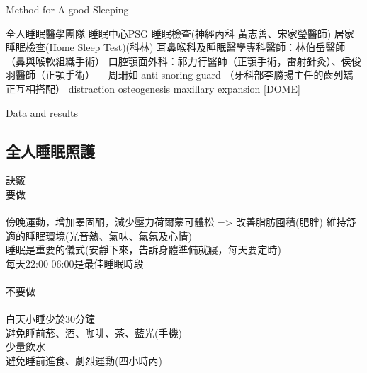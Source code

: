 \documentclass[aspectratio=169]{beamer}
\begin{document}
\begin{frame}{Method for A good Sleeping}
\begin{block}{全人睡眠醫學團隊}
睡眠中心PSG 睡眠檢查(神經內科 黃志善、宋家瑩醫師)
居家睡眠檢查(Home Sleep Test)(科林)
耳鼻喉科及睡眠醫學專科醫師：林伯岳醫師（鼻與喉軟組織手術）
口腔顎面外科：祁力行醫師（正顎手術，雷射針灸）、侯俊羽醫師（正顎手術）
—周珊如 anti-snoring guard
（牙科部李勝揚主任的齒列矯正互相搭配）
distraction osteogenesis maxillary expansion [DOME]
~~\\
\end{block}
\end{frame}


\begin{frame}{Data and results}
\subsection{全人睡眠照護}
\begin{block}{訣竅}
~~\\
要做\\
~~\\
傍晚運動，增加睪固酮，減少壓力荷爾蒙可體松 => 改善脂肪囤積(肥胖)
維持舒適的睡眠環境(光音熱、氣味、氣氛及心情)\\
睡眠是重要的儀式(安靜下來，告訴身體準備就寢，每天要定時)\\
每天22:00-06:00是最佳睡眠時段\\

~~\\
不要做\\
~~\\
白天小睡少於30分鐘\\
避免睡前菸、酒、咖啡、茶、藍光(手機)\\
少量飲水\\
避免睡前進食、劇烈運動(四小時內)\\
~~\\
~~\\
\end{block}
\end{frame}
\end{document}
